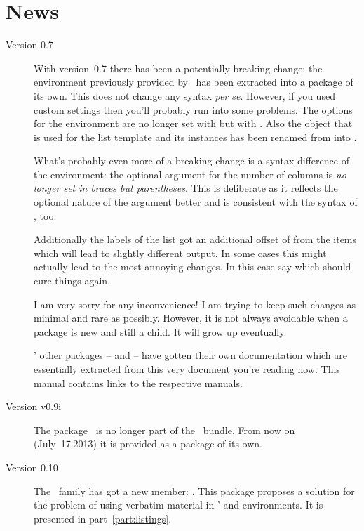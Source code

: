 \documentclass[load-preamble+,scrartcl={DIV10}]{cnltx-doc}
\begin{document}
\section{News}
\begin{description}
\item[Version 0.7]
  With version~0.7 there has been a potentially breaking change: the
   environment previously provided by \ExSheets\ has been
  extracted into a package of its own.  This does not change any syntax
  \emph{per se}. However, if you used custom settings then you'll probably run
  into some problems.  The options for the environment are no longer set with
   but with .  Also the object that is used for
  the list template and its instances has been renamed from
   into .

  What's probably even more of a breaking change is a syntax difference of the
   environment: the optional argument for the number of columns is
  \emph{no longer set in braces but parentheses}.  This is deliberate as it
  reflects the optional nature of the argument better and is consistent with
  the syntax of , too.

  Additionally the labels of the list got an additional offset of \code{1ex}
  from the items which will lead to slightly different output.  In some cases
  this might actually lead to the most annoying changes.  In this case say
   which should cure things again.

  I am very sorry for any inconvenience!  I am trying to keep such changes as
  minimal and rare as possibly.  However, it is not always avoidable when a
  package is new and still a child. It will grow up eventually.

  \ExSheets' other packages -- \href{tasks_en.pdf}{\Tasks} and
  \href{cntformats_en.pdf}{\cntformats} -- have gotten their own documentation
  which are essentially extracted from this very document you're reading now.
  This manual contains links to the respective manuals.

\item[Version v0.9i]
  The  package~\cite{pkg:translations} is no longer part of
  the \ExSheets\ bundle.  From now on (July~17.\@ 2013) it is provided as a
  package of its own.

\item[Version 0.10]
  The \ExSheets\ family has got a new member: \ExSheetslistings.  This package
  proposes a solution for the problem of using verbatim material in \ExSheets'
   and  environments.  It is presented in
  part~\ref{part:listings}.


\end{description}
\end{document}
